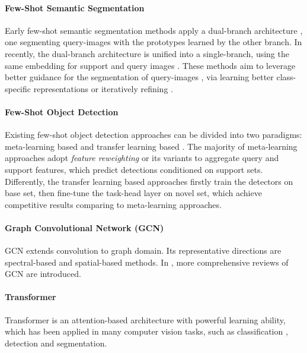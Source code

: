 \documentclass{article}
\begin{document}
\paragraph{Few-Shot Semantic Segmentation}
Early few-shot semantic segmentation methods apply a dual-branch architecture \cite{shaban2017one,dong2018few,rakelly2018conditional}, one segmenting query-images with the prototypes learned by the other branch. In recently, the dual-branch architecture is unified into a single-branch, using the same embedding for support and query images \cite{zhang2020sg,siam2019amp,wang2019panet,rpmm,ppnet}. These methods aim to leverage better guidance for the segmentation of query-images \cite{zhang2020sg,nguyen2019feature,wangfew,zhang2019pyramid}, via learning better class-specific representations \cite{wang2019panet,liu2020crnet,ppnet,rpmm,siam2019amp} or iteratively refining \cite{zhang2019canet}.

\paragraph{Few-Shot Object Detection}
Existing few-shot object detection approaches can be divided into two paradigms: meta-learning based \cite{kang2019few,xiao2020few,fan2020few,hu2021dense} and transfer learning based \cite{wang2020frustratingly,wu2020multi,sun2021fsce,fan2021generalized,qiao2021defrcn,wu2022multi}.
The majority of meta-learning approaches adopt \emph{feature reweighting} or its variants to aggregate query and support features, which predict detections conditioned on support sets. Differently, the transfer learning based approaches firstly train the detectors on base set, then fine-tune the task-head layer on novel set, which achieve competitive results comparing to meta-learning approaches.

\paragraph{Graph Convolutional Network (GCN)}
GCN \cite{bruna2013spectral,atwood2016diffusion} extends convolution to graph domain.
Its representative directions are spectral-based \cite{defferrard2016convolutional,levie2018cayleynets} and spatial-based \cite{niepert2016learning,gilmer2017neural} methods.
In \cite{zonghan2020gcn}, more comprehensive reviews of GCN are introduced.

\paragraph{Transformer}
Transformer is an attention-based architecture with powerful learning ability, which has been applied in many computer vision tasks, such as classification \cite{wang2021pyramid}, detection\cite{zhu2020deformable} and segmentation\cite{zheng2021rethinking,liang2020polytransform}.
\end{document}
